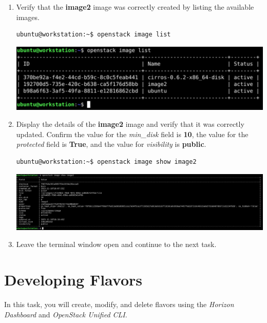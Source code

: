 \documentclass[letterpaper, 12pt]{article}
\begin{document}
\begin{enumerate}
    \item Verify that the \textbf{image2} image was correctly created by listing the available images.
\begin{lstlisting}
ubuntu@workstation:~$ openstack image list
\end{lstlisting}

    \begin{center}
        \includegraphics[width=\linewidth]{images/part1/step16.png}
    \end{center}

    \item Display the details of the \textbf{image2} image and verify that it was correctly updated. Confirm the value
    for the \textit{min\_disk} field is \textbf{10}, the value for the \textit{protected} field is \textbf{True}, and
    the value for \textit{visibility} is \textbf{public}.
\begin{lstlisting}
ubuntu@workstation:~$ openstack image show image2
\end{lstlisting}

    \begin{center}
        \includegraphics[width=\linewidth]{images/part1/step17.png}
    \end{center}

    \item Leave the terminal window open and continue to the next task.

\end{enumerate}

\section{Developing Flavors}
\label{sec:developing_flavors}
In this task, you will create, modify, and delete flavors using the \textit{Horizon Dashboard} and
\textit{OpenStack Unified CLI}.
\end{document}
